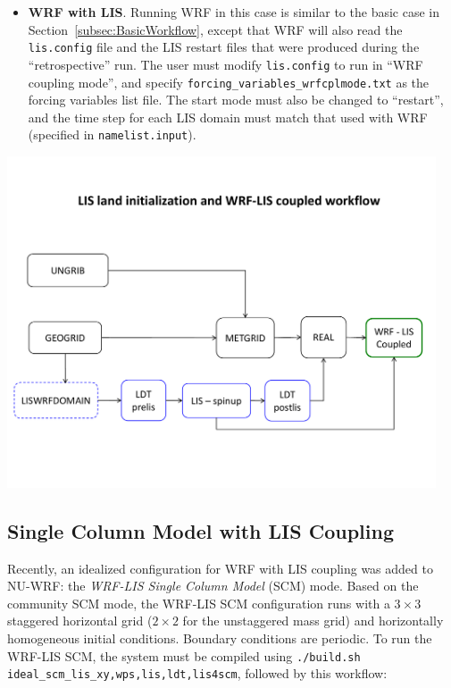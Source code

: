 \begin{itemize}
\item \textbf{WRF with LIS}. Running WRF in this case is similar to the
basic case in Section~\ref{subsec:BasicWorkflow}, except that WRF will 
also read the \texttt{lis.config} file and the LIS restart files that were
produced during the ``retrospective'' run. The user must modify 
\texttt{lis.config} to run in ``WRF coupling mode'', and specify 
\texttt{forcing\_variables\_wrfcplmode.txt} as the forcing variables list file.
The start mode must also be changed to ``restart'', and the time step for
each LIS domain must match that used with WRF (specified in 
\texttt{namelist.input}).

\end{itemize}

\centerline{\includegraphics[width=5.0in]{LIS_workflow}}


\subsection{Single Column Model with LIS Coupling}
\label{subsec:ScmLisCoupling}

Recently, an idealized configuration for WRF with LIS coupling was added to
NU-WRF:  the \emph{WRF-LIS Single Column Model} (SCM) mode.  Based on the 
community SCM mode, the WRF-LIS SCM configuration runs with a $3 \times 3$ 
staggered horizontal grid ($2 \times 2$ for the unstaggered mass grid) and 
horizontally homogeneous initial conditions.  Boundary conditions are 
periodic.  To run the WRF-LIS SCM, the system must be compiled using
\texttt{./build.sh ideal\_scm\_lis\_xy,wps,lis,ldt,lis4scm}, followed by this
workflow:

